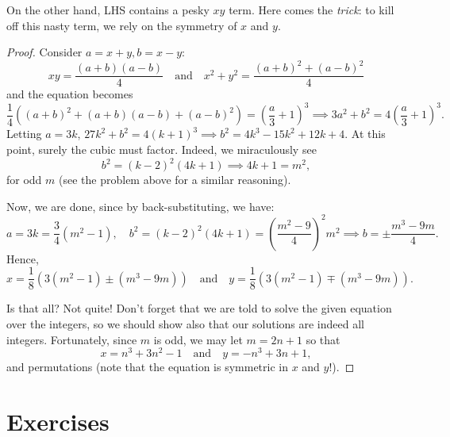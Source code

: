 \documentclass[../jarvis.tex]{subfiles}
\begin{document}
On the other hand, LHS contains a pesky $xy$ term. Here comes the \textit{trick}: to kill off this nasty term, we rely on the symmetry of $x$ and $y$. 
\begin{proof}
    Consider $a=x+y, b=x-y$:
    $$xy= \frac{(a+b)(a-b)}{4} \quad\text{and}\quad x^2+y^2= \frac{(a+b)^2+(a-b)^2}{4}$$
and the equation becomes
$$\frac{1}{4}\left((a+b)^2+(a+b)(a-b)+(a-b)^2\right)=\left(\frac{a}{3}+1\right)^3 \implies 3a^2+b^2=4\left(\frac{a}{3}+1\right)^3.$$
Letting $a=3k$, $27k^2+b^2=4(k+1)^3 \implies b^2=4k^3-15k^2+12k+4$.
At this point, surely the cubic must factor. Indeed, we miraculously see
$$b^2=(k-2)^2(4k+1) \implies 4k+1=m^2,$$
for odd $m$ (see the problem above for a similar reasoning).

Now, we are done, since by back-substituting, we have:
$$a=3k=\frac{3}{4}(m^2-1), \quad b^2=(k-2)^2(4k+1)=\left(\frac{m^2-9}{4}\right)^2m^2 \implies b=\pm \frac{m^3-9m}{4}.$$
Hence,
$$x=\frac{1}{8}\left(3(m^2-1)\pm(m^3-9m)\right)\quad\text{and}\quad y=\frac{1}{8}\left(3(m^2-1)\mp(m^3-9m)\right).$$

Is that all? Not quite! Don't forget that we are told to solve the given equation over the integers, so we should show also that our solutions are indeed all integers. Fortunately, since $m$ is odd, we may let $m=2n+1$ so that
$$\boxed{x=n^3+3n^2-1\quad\text{and}\quad y=-n^3+3n+1},$$
and permutations (note that the equation is symmetric in $x$ and $y$!).
\end{proof}

\section{Exercises}
\end{document}
